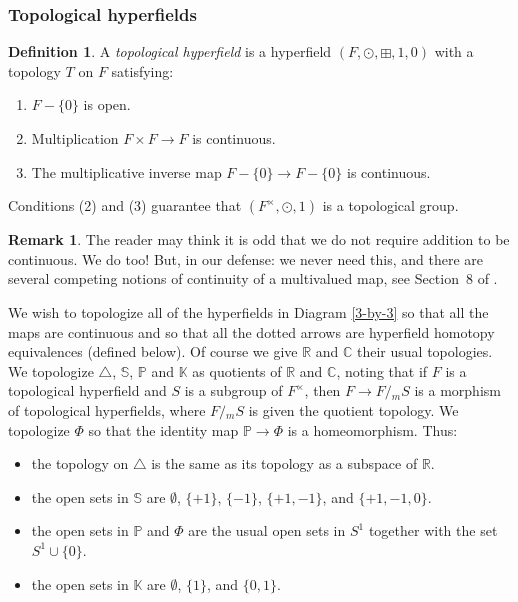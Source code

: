 \documentclass[10pt, preprint]{article}
\theoremstyle{definition}
\newtheorem{definition}[theorem]{Definition}
\newtheorem{remark}[theorem]{Remark}
\begin{document}
\subsubsection{Topological hyperfields}%
\label{topological_hyperfields}

\begin{definition}
\label{top_hyper}
A \emph{topological hyperfield} is a hyperfield $(F, \odot , \boxplus
, 1, 0)$ with a topology $T$ on $F$ satisfying:\vspace*{-2pt}
%
\begin{enumerate}%
\item
\label{nonzero_open}
$F-\{0\}$ is open.
%
\item
Multiplication $F \times F \to F$ is continuous.
%
\item
The multiplicative inverse map $F-\{0\} \to F-\{0\}$ is continuous.\vspace*{-2pt}
\end{enumerate}
%
\end{definition}

Conditions (2) and (3) guarantee that $(F^{\times }, \odot , 1)$ is
a topological group.

\begin{remark}
The reader may think it is odd that we do not require addition to be
continuous. We do too! But, in our defense: we never need this, and
there are several competing notions of continuity of a multivalued map,
see Section~8 of \cite{Viro}.
\end{remark}

We wish to topologize all of the hyperfields in Diagram \eqref{3-by-3} so that all the maps are continuous and so that all the
dotted arrows are hyperfield homotopy equivalences (defined below). Of
course we give $\mathbb{R}$ and $\mathbb{C}$ their usual topologies. We
topologize $\triangle $, $\mathbb{S}$, $\mathbb{P}$ and $\mathbb{K}$ as
quotients of $\mathbb{R}$ and $\mathbb{C}$, noting that if $F$ is a
topological hyperfield and $S$ is a subgroup of $F^{\times }$, then
$F \to F/{}_{m}S$ is a morphism of topological hyperfields, where
$F/{}_{m}S$ is given the quotient topology. We topologize $\Phi $ so
that the identity map $\mathbb{P}\to \Phi $ is a homeomorphism. Thus:
%
\begin{itemize}%
\item
the topology on $\triangle $ is the same as its topology as a subspace
of $\mathbb{R}$.
%
\item
the open sets in $\mathbb{S}$ are $\emptyset $, $\{+1\}$, $\{-1\}$,
$\{+1, -1\}$, and $\{+1, -1, 0\}$.
%
\item
the open sets in $\mathbb{P}$ and $\Phi $ are the usual open sets in
$S^{1}$ together with the set $S^{1}\cup \{0\}$.
%
\item
the open sets in $\mathbb{K}$ are $\emptyset $, $\{1\}$, and
$\{0,1\}$.
\end{itemize}
\end{document}

